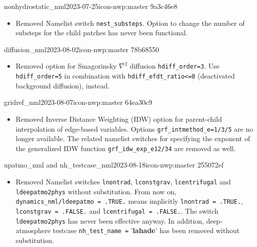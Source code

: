 \begin{changeitem}{nonhydrostatic\_nml}{2023-07-25}{icon-nwp:master 9a3c46e8}
  \begin{itemize}
   \item Removed Namelist switch \texttt{nest\_substeps}. Option to change the number of substeps for the child patches has never been functional.
  \end{itemize}
\end{changeitem}

\begin{changeitem}{diffusion\_nml}{2023-08-02}{icon-nwp:master 78b68550}
  \begin{itemize}
   \item Removed option for Smagorinsky $\nabla^{2}$ diffusion \texttt{hdiff\_order=3}. Use \texttt{hdiff\_order=5} in combination with \texttt{hdiff\_efdt\_ratio<=0} (deactivated background diffusion), instead.
  \end{itemize}
\end{changeitem}

\begin{changeitem}{gridref\_nml}{2023-08-07}{icon-nwp:master 64ea30c9}
  \begin{itemize}
   \item Removed Inverse Distance Weighting (IDW) option for parent-child interpolation of edge-based variables. Options \texttt{grf\_intmethod\_e=1/3/5} are no longer available. The related namelist switches for specifying the exponent of the generalized IDW function \texttt{grf\_idw\_exp\_e{12/34}} are removed as well.
  \end{itemize}
\end{changeitem}

\begin{changeitem}{upatmo\_nml and nh\_testcase\_nml}{2023-08-18}{icon-nwp:master 255072ef}
  \begin{itemize}
    \item Removed Namelist switches \texttt{lnontrad}, \texttt{lconstgrav}, \texttt{lcentrifugal} and \texttt{ldeepatmo2phys} without substitution.
         From now on, \texttt{dynamics\_nml/ldeepatmo = .TRUE.} means implicitly \texttt{lnontrad = .TRUE.}, \texttt{lconstgrav = .FALSE.} and \texttt{lcentrifugal = .FALSE.}.
         The switch \texttt{ldeepatmo2phys} has never been effective anyway. \newline
         In addition, deep-atmosphere testcase \texttt{nh\_test\_name =} '\textbf{lahade}' has been removed without substitution.
  \end{itemize}
\end{changeitem}

